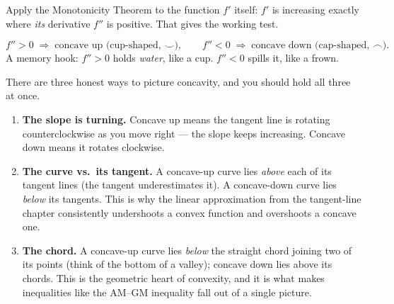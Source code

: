 Apply the Monotonicity Theorem to the function $f'$ itself: $f'$ is increasing
exactly where \emph{its} derivative $f''$ is positive. That gives the working test.

\begin{focusbox}
\[
f''>0 \;\Longrightarrow\; \text{concave up (cup-shaped, }\smile\text{)},
\qquad
f''<0 \;\Longrightarrow\; \text{concave down (cap-shaped, }\frown\text{)}.
\]
A memory hook: $f''>0$ holds \emph{water}, like a cup. $f''<0$ spills it, like a
frown.
\end{focusbox}

\begin{intuitionbox}
There are three honest ways to picture concavity, and you should hold all three at
once.
\begin{enumerate}
\item \textbf{The slope is turning.} Concave up means the tangent line is rotating
counterclockwise as you move right --- the slope keeps increasing. Concave down
means it rotates clockwise.
\item \textbf{The curve vs.\ its tangent.} A concave-up curve lies \emph{above}
each of its tangent lines (the tangent underestimates it). A concave-down curve
lies \emph{below} its tangents. This is why the linear approximation from the
tangent-line chapter consistently undershoots a convex function and overshoots a
concave one.
\item \textbf{The chord.} A concave-up curve lies \emph{below} the straight chord
joining two of its points (think of the bottom of a valley); concave down lies
above its chords. This is the geometric heart of convexity, and it is what makes
inequalities like the AM--GM inequality fall out of a single picture.
\end{enumerate}
\end{intuitionbox}

